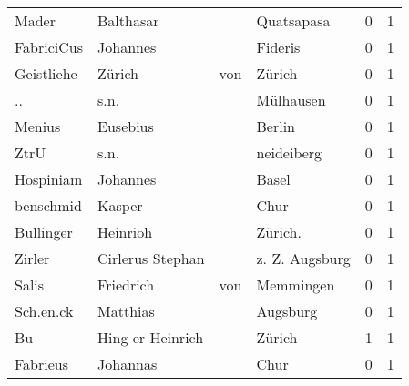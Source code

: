 \documentclass[10pt,a4paper,landscape]{article}
\begin{document}
\begin{longtable}{llllrr}
                    Mader &                          Balthasar &             &                                  Quatsapasa &          0 &         1 \\
               FabriciCus &                           Johannes &             &                                     Fideris &          0 &         1 \\
               Geistliehe &                             Zürich &         von &                                      Zürich &          0 &         1 \\
                       .. &                               s.n. &             &                                   Mülhausen &          0 &         1 \\
                   Menius &                           Eusebius &             &                                      Berlin &          0 &         1 \\
                     ZtrU &                               s.n. &             &                                  neideiberg &          0 &         1 \\
                Hospiniam &                           Johannes &             &                                       Basel &          0 &         1 \\
                benschmid &                             Kasper &             &                                        Chur &          0 &         1 \\
                Bullinger &                           Heinrioh &             &                                    Zürich.  &          0 &         1 \\
                   Zirler &                   Cirlerus Stephan &             &                              z. Z. Augsburg &          0 &         1 \\
                    Salis &                          Friedrich &         von &                                   Memmingen &          0 &         1 \\
                Sch.en.ck &                           Matthias &             &                                    Augsburg &          0 &         1 \\
                       Bu &                   Hing er Heinrich &             &                                      Zürich &          1 &         1 \\
                 Fabrieus &                           Johannas &             &                                        Chur &          0 &         1 \\

\end{longtable}
\end{document}
